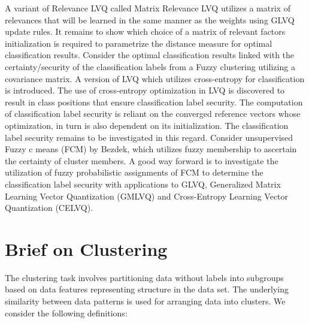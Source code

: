 A variant of Relevance LVQ  called Matrix Relevance LVQ utilizes a matrix of relevances that will be learned in the same manner as the weights using GLVQ update rules\cite{schneider2009adaptive}. 
It remains to show which choice of a matrix of relevant factors initialization is required to parametrize the distance measure for optimal classification results\cite{hammer2002generalized,bunte2012limited}. Consider the optimal classification results linked with the certainty/security of the classification labels from a Fuzzy clustering utilizing a covariance matrix\cite{gath1989unsupervised}. A version of LVQ which utilizes cross-entropy for classification is introduced\cite{villmann2018probabilistic,kaden2014aspects}. The use of cross-entropy optimization in LVQ is discovered to result in class positions that ensure classification label security\cite{villmann2018probabilistic}. The computation of classification label security is reliant on the converged reference vectors\cite{bezdek1981pattern} whose optimization, in turn is also dependent on its initialization\cite{boubezoul2008application}.
The classification label security remains to be investigated in this regard.
Consider unsupervised Fuzzy c means (FCM) by Bezdek, which utilizes fuzzy membership to ascertain the certainty of cluster members\cite{bezdek1981pattern}. A good way forward is to investigate the utilization of fuzzy probabilistic assignments of FCM to determine the classification label security with applications to GLVQ, Generalized Matrix Learning Vector Quantization (GMLVQ) and Cross-Entropy Learning Vector Quantization (CELVQ).

\section{Brief on Clustering}
The clustering task involves partitioning data without labels into subgroups based on data features representing structure in the data set. The underlying similarity between data patterns is used for arranging data into clusters. We consider the following definitions:

